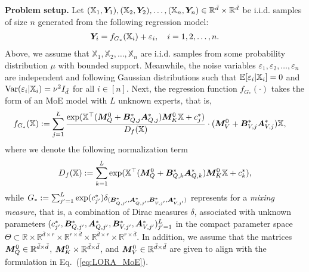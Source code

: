 \vspace{0.5 em}
\noindent
\textbf{Problem setup.} 
Let $(\mathbb{X}_1,{\bm Y}_1), (\mathbb{X}_2,{\bm Y}_2),\ldots,(\mathbb{X}_n,{\bm Y}_n)\in\mathbb{R}^{\bar{d}} \times\mathbb{R}^{\bar{d}}$ be i.i.d. samples of size $n$ generated from the following regression model:
\begin{align}
    {\bm Y}_i=f_{G_*}(\mathbb{X}_i)+\varepsilon_i, \quad i=1,2,\ldots,n. 
    \label{eq:regression_model}
\end{align}
Above, we assume that $\mathbb{X}_{1}, \mathbb{X}_{2}, \ldots, \mathbb{X}_{n}$ are i.i.d. samples from some probability distribution $\mu$ with bounded support. Meanwhile, the noise variables $\varepsilon_1,\varepsilon_2,\ldots,\varepsilon_n$ are independent and following Gaussian distributions such that $\mathbb{E}[{\varepsilon_{i}}|\mathbb{X}_i] = 0$ and $\mathrm{Var}(\varepsilon_{i}|\mathbb{X}_i) = \nu^2I_{\bar{d}}$ for all $i \in [n]$. Next, the regression function $f_{G_{*}}(\cdot)$ takes the form of an MoE model with $L$ unknown experts, that is,
\begin{align}
 \hspace{-0.25 em}   &f_{G_{*}}(\mathbb{X})  := \sum_{j=1}^{L} \frac{\exp(\mathbb{X}^{\top} ({\bm M}^0_{Q}+{\bm B}_{Q,j}^*{\bm A}_{Q,j}^*){\bm M}^{0}_{K}\mathbb{X}+c^*_j)}{D_{f}(\mathbb{X})} \cdot({\bm M}^0_{V}+{\bm B}_{V,j}^*
{\bm A}_{V,j}^*)\mathbb{X}, \label{eq:true_regression_function}
\end{align}
where we denote the following normalization term $$D_{f}(\mathbb{X}) := \sum_{k = 1}^{L}\exp(\mathbb{X}^{\top}({\bm M}^0_{Q}+{\bm B}_{Q,k}^*{\bm A}_{Q,k}^*){\bm M}^{0}_{K}\mathbb{X}+c^*_{k}),$$ while $G_{*} := \sum_{j' = 1}^{L} \exp(c^*_{j'}) \delta_{({\bm B}_{Q,j'}^*,{\bm A}_{Q,j'}^*,{\bm B}_{V,j'}^*,{\bm A}_{V,j'}^*)}$ represents for a \emph{mixing measure}, that is, a combination of Dirac measures $\delta$, associated with unknown parameters $(c_{j'}^*,{\bm B}_{Q,j'}^*,{\bm A}_{Q,j'}^*,{\bm B}_{V,j'}^*,{\bm A}_{V,j'}^*)_{j'=1}^{L}$ in the compact parameter space $\Theta\subset\mathbb{R} \times\mathbb{R}^{\bar{d}\times r}\times\mathbb{R}^{r\times \bar{d}}\times\mathbb{R}^{\bar{d}\times r}\times\mathbb{R}^{r\times \bar{d}}$. In addition, we assume that the matrices ${\bm M}^0_{Q} \in \mathbb{R}^{\bar{d} \times \bar{d}}$, ${\bm M}_{K}^{0} \times \mathbb{R}^{\bar{d} \times \bar{d}}$, and ${\bm M}_{V}^{0} \in \mathbb{R}^{\bar{d} \times \bar{d}}$ are given to align with the formulation in Eq.~(\ref{eq:LORA_MoE}).

